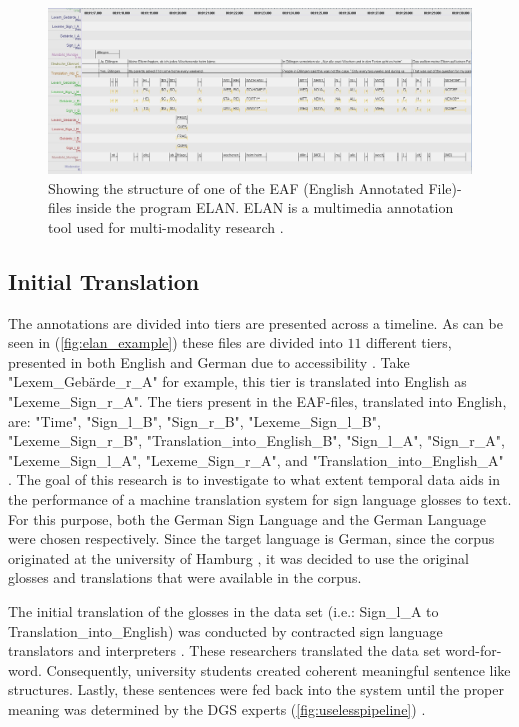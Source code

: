 \begin{figure}[h]
\caption{Showing the structure of one of the EAF (English Annotated File)-files \cite{elan_example} inside the program ELAN. ELAN is a multimedia annotation tool used for multi-modality research \cite{sloetjes2017elan}. }
 \centering 
 \includegraphics[width=14cm]{Bachelor CSAI thesis template/images/ELAN_example.jpg}
 
 \label{fig:elan_example}
\end{figure}

\subsection{Initial Translation}

The annotations are divided into tiers are presented across a timeline. As can be seen in (\autoref{fig:elan_example}) these files are divided into $11$ different tiers, presented in both English and German due to accessibility \cite{konradoffentliches}. Take "Lexem\_Gebärde\_r\_A" for example, this tier is translated into English as "Lexeme\_Sign\_r\_A". The tiers present in the EAF-files, translated into English, are: "Time", "Sign\_l\_B", "Sign\_r\_B", "Lexeme\_Sign\_l\_B", "Lexeme\_Sign\_r\_B", 
"Translation\_into\_English\_B", "Sign\_l\_A", "Sign\_r\_A", "Lexeme\_Sign\_l\_A", "Lexeme\_Sign\_r\_A", and "Translation\_into\_English\_A" \cite{sloetjes2017elan}. The goal of this research is to investigate to what extent temporal data aids in the performance of a machine translation system for sign language glosses to text. For this purpose, both the German Sign Language and the German Language were chosen respectively. Since the target language is German, since the corpus originated at the university of Hamburg \cite{age_data_hamburg}, it was decided to use the original glosses and translations that were available in the corpus. 

The initial translation of the glosses in the data set (i.e.: Sign\_l\_A to Translation\_into\_English) was conducted by contracted sign language translators and interpreters \cite{konradoffentliches}. These researchers translated the data set word-for-word. Consequently, university students created coherent meaningful sentence like structures. Lastly, these sentences were fed back into the system until the proper meaning was determined by the DGS experts (\autoref{fig:uselesspipeline}) \cite{konradoffentliches}.

